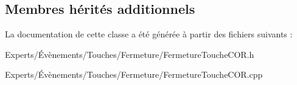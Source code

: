 \subsection*{Membres hérités additionnels}


La documentation de cette classe a été générée à partir des fichiers suivants \+:\begin{DoxyCompactItemize}
\item 
Experts/Évènements/\+Touches/\+Fermeture/Fermeture\+Touche\+C\+O\+R.\+h\item 
Experts/Évènements/\+Touches/\+Fermeture/Fermeture\+Touche\+C\+O\+R.\+cpp\end{DoxyCompactItemize}
